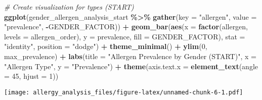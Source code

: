 \documentclass[
]{article}
\newenvironment{Shaded}{\begin{snugshade}}{\end{snugshade}}
\newcommand{\AttributeTok}[1]{\textcolor[rgb]{0.13,0.29,0.53}{#1}}
\newcommand{\CommentTok}[1]{\textcolor[rgb]{0.56,0.35,0.01}{\textit{#1}}}
\newcommand{\DecValTok}[1]{\textcolor[rgb]{0.00,0.00,0.81}{#1}}
\newcommand{\FunctionTok}[1]{\textcolor[rgb]{0.13,0.29,0.53}{\textbf{#1}}}
\newcommand{\NormalTok}[1]{#1}
\newcommand{\SpecialCharTok}[1]{\textcolor[rgb]{0.81,0.36,0.00}{\textbf{#1}}}
\newcommand{\StringTok}[1]{\textcolor[rgb]{0.31,0.60,0.02}{#1}}
\begin{document}
\begin{Shaded}
\begin{Highlighting}[]
\CommentTok{\# Create visualization for types (START)}
\FunctionTok{ggplot}\NormalTok{(gender\_allergen\_analysis\_start }\SpecialCharTok{\%\textgreater{}\%} 
       \FunctionTok{gather}\NormalTok{(}\AttributeTok{key =} \StringTok{"allergen"}\NormalTok{, }\AttributeTok{value =} \StringTok{"prevalence"}\NormalTok{, }\SpecialCharTok{{-}}\NormalTok{GENDER\_FACTOR)) }\SpecialCharTok{+}
  \FunctionTok{geom\_bar}\NormalTok{(}\FunctionTok{aes}\NormalTok{(}\AttributeTok{x =} \FunctionTok{factor}\NormalTok{(allergen, }\AttributeTok{levels =}\NormalTok{ allergen\_order), }
               \AttributeTok{y =}\NormalTok{ prevalence, }\AttributeTok{fill =}\NormalTok{ GENDER\_FACTOR), }
           \AttributeTok{stat =} \StringTok{"identity"}\NormalTok{, }\AttributeTok{position =} \StringTok{"dodge"}\NormalTok{) }\SpecialCharTok{+}
  \FunctionTok{theme\_minimal}\NormalTok{() }\SpecialCharTok{+}
  \FunctionTok{ylim}\NormalTok{(}\DecValTok{0}\NormalTok{, max\_prevalence) }\SpecialCharTok{+}
  \FunctionTok{labs}\NormalTok{(}\AttributeTok{title =} \StringTok{"Allergen Prevalence by Gender (START)"}\NormalTok{,}
       \AttributeTok{x =} \StringTok{"Allergen Type"}\NormalTok{,}
       \AttributeTok{y =} \StringTok{"Prevalence"}\NormalTok{) }\SpecialCharTok{+}
  \FunctionTok{theme}\NormalTok{(}\AttributeTok{axis.text.x =} \FunctionTok{element\_text}\NormalTok{(}\AttributeTok{angle =} \DecValTok{45}\NormalTok{, }\AttributeTok{hjust =} \DecValTok{1}\NormalTok{))}
\end{Highlighting}
\end{Shaded}

\texttt{[image: allergy\_analysis\_files/figure-latex/unnamed-chunk-6-1.pdf]}
\end{document}
